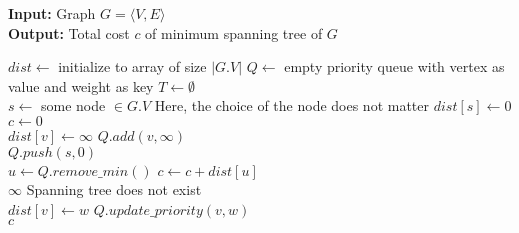 \documentclass[12pt,a4paper]{article}
\begin{document}
	\begin{algorithm}
		\textbf{Input:} Graph $ G = \langle V, E \rangle $
		\\\textbf{Output:} Total cost $ c $ of minimum spanning tree of $ G $
		\begin{algorithmic}
			\State $ dist \gets $ initialize to array of size $ |G.V| $
			\State $ Q \gets $ empty priority queue with vertex as value and weight as key
			\State $ T \gets \emptyset $
			\\
			\State $ s \gets $ some node $ \in G.V $ \Comment Here, the choice of the node does not matter
			\State $ dist[s] \gets 0 $
			\State $ c \gets 0 $
			\\
				\State $ dist[v] \gets \infty $
					\State $ Q.add(v, \infty) $
				\EndIf
			\EndFor
			\\
			\State $ Q.push(s, 0) $
			\\
				\State $ u \gets Q.remove\_min() $
				\State $ c \gets c + dist[u] $
				\\
					\State \Return $ \infty $ \Comment Spanning tree does not exist
				\EndIf
				\\
						\State $ dist[v] \gets w $
						\State $ Q.update\_priority(v, w) $
				\EndIf
				\EndFor
			\EndWhile
			\\
			\Return $ c $
			\EndProcedure
		\end{algorithmic}
	\end{algorithm}
\end{document}
